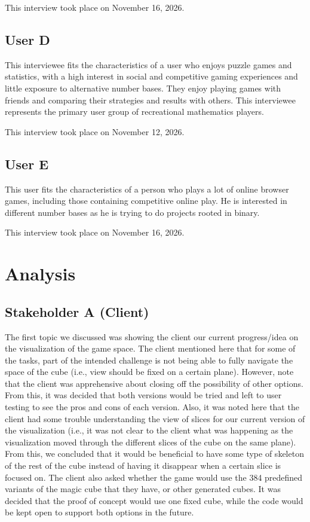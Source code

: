 \documentclass{article}
\begin{document}
This interview took place on November 16, 2026.

\subsection{User D}

This interviewee fits the characteristics of a user who enjoys puzzle games and statistics, with a high interest in social and competitive gaming experiences and little exposure to alternative number bases.
They enjoy playing games with friends and comparing their strategies and results with others.
This interviewee represents the primary user group of recreational mathematics players.

This interview took place on November 12, 2026.

\subsection{User E}

This user fits the characteristics of a person who plays a lot of online browser games, including those containing competitive online play. He is interested in different number bases as he is trying to do projects rooted in binary.

This interview took place on November 16, 2026.

\section{Analysis}

\subsection{Stakeholder A (Client)}
 
The first topic we discussed was showing the client our current progress/idea on the visualization of the game space. The client mentioned here that for some of the tasks, part of the intended challenge is not being able to fully navigate the space of the cube (i.e., view should be fixed on a certain plane). However, note that the client was apprehensive about closing off the possibility of other options. From this, it was decided that both versions would be tried and left to user testing to see the pros and cons of each version. Also, it was noted here that the client had some trouble understanding the view of slices for our current version of the visualization (i.e., it was not clear to the client what was happening as the visualization moved through the different slices of the cube on the same plane). From this, we concluded that it would be beneficial to have some type of skeleton of the rest of the cube instead of having it disappear when a certain slice is focused on. The client also asked whether the game would use the 384 predefined variants of the magic cube that they have, or other generated cubes. It was decided that the proof of concept would use one fixed cube, while the code would be kept open to support both options in the future.
\end{document}
